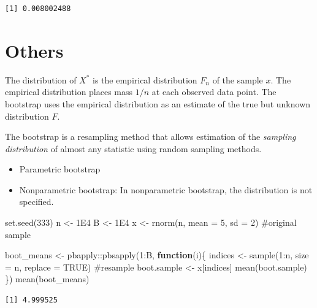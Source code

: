 \documentclass[
  letterpaper,
  DIV=11,
  numbers=noendperiod]{scrreprt}
\newenvironment{Shaded}{\begin{snugshade}}{\end{snugshade}}
\newcommand{\AttributeTok}[1]{\textcolor[rgb]{0.40,0.45,0.13}{#1}}
\newcommand{\CommentTok}[1]{\textcolor[rgb]{0.37,0.37,0.37}{#1}}
\newcommand{\ConstantTok}[1]{\textcolor[rgb]{0.56,0.35,0.01}{#1}}
\newcommand{\ControlFlowTok}[1]{\textcolor[rgb]{0.00,0.23,0.31}{\textbf{#1}}}
\newcommand{\DecValTok}[1]{\textcolor[rgb]{0.68,0.00,0.00}{#1}}
\newcommand{\FloatTok}[1]{\textcolor[rgb]{0.68,0.00,0.00}{#1}}
\newcommand{\FunctionTok}[1]{\textcolor[rgb]{0.28,0.35,0.67}{#1}}
\newcommand{\NormalTok}[1]{\textcolor[rgb]{0.00,0.23,0.31}{#1}}
\newcommand{\OtherTok}[1]{\textcolor[rgb]{0.00,0.23,0.31}{#1}}
\newcommand{\SpecialCharTok}[1]{\textcolor[rgb]{0.37,0.37,0.37}{#1}}
\begin{document}
\begin{verbatim}
[1] 0.008002488
\end{verbatim}

\section{Others}\label{others}

The distribution of \(X^\ast\) is the empirical distribution \(F_n\) of
the sample \(x\). The empirical distribution places mass \(1/n\) at each
observed data point. The bootstrap uses the empirical distribution as an
estimate of the true but unknown distribution \(F\).

The bootstrap is a resampling method that allows estimation of the
\emph{sampling distribution} of almost any statistic using random
sampling methods.

\begin{itemize}
\item
  Parametric bootstrap
\item
  Nonparametric bootstrap: In nonparametric bootstrap, the distribution
  is not specified.
\end{itemize}

\begin{Shaded}
\begin{Highlighting}[]
\FunctionTok{set.seed}\NormalTok{(}\DecValTok{333}\NormalTok{)}
\NormalTok{n }\OtherTok{\textless{}{-}} \FloatTok{1E4}
\NormalTok{B }\OtherTok{\textless{}{-}} \FloatTok{1E4}
\NormalTok{x }\OtherTok{\textless{}{-}} \FunctionTok{rnorm}\NormalTok{(n, }\AttributeTok{mean =} \DecValTok{5}\NormalTok{, }\AttributeTok{sd =} \DecValTok{2}\NormalTok{) }\CommentTok{\#original sample}


\NormalTok{boot\_means }\OtherTok{\textless{}{-}}\NormalTok{ pbapply}\SpecialCharTok{::}\FunctionTok{pbsapply}\NormalTok{(}\DecValTok{1}\SpecialCharTok{:}\NormalTok{B, }\ControlFlowTok{function}\NormalTok{(i)\{}
\NormalTok{  indices }\OtherTok{\textless{}{-}} \FunctionTok{sample}\NormalTok{(}\DecValTok{1}\SpecialCharTok{:}\NormalTok{n, }\AttributeTok{size =}\NormalTok{ n, }\AttributeTok{replace =} \ConstantTok{TRUE}\NormalTok{) }\CommentTok{\#resample}
\NormalTok{  boot.sample }\OtherTok{\textless{}{-}}\NormalTok{ x[indices]}
  \FunctionTok{mean}\NormalTok{(boot.sample)}
\NormalTok{\}) }
\FunctionTok{mean}\NormalTok{(boot\_means)}
\end{Highlighting}
\end{Shaded}

\begin{verbatim}
[1] 4.999525
\end{verbatim}
\end{document}
